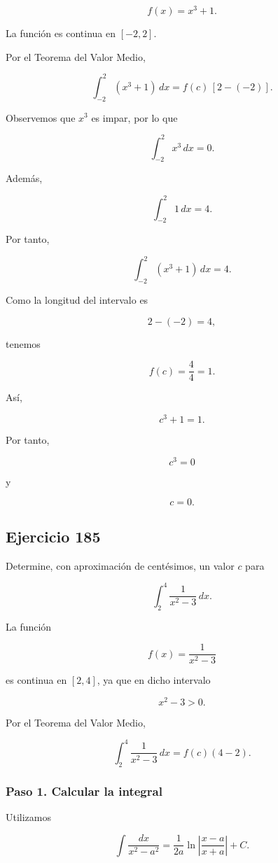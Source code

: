 \documentclass[12pt]{article}
\begin{document}
\[
f(x)=x^3+1.
\]

La función es continua en \([-2,2]\).

Por el Teorema del Valor Medio,

\[
\int_{-2}^{2}(x^3+1)\,dx
=
f(c)\,[2-(-2)].
\]

Observemos que \(x^3\) es impar, por lo que

\[
\int_{-2}^{2}x^3\,dx=0.
\]

Además,

\[
\int_{-2}^{2}1\,dx=4.
\]

Por tanto,

\[
\int_{-2}^{2}(x^3+1)\,dx=4.
\]

Como la longitud del intervalo es

\[
2-(-2)=4,
\]

tenemos

\[
f(c)=\frac44=1.
\]

Así,

\[
c^3+1=1.
\]

Por tanto,

\[
c^3=0
\]

y

\[
\boxed{c=0}.
\]

\subsection*{Ejercicio 185}

Determine, con aproximación de centésimos, un valor \(c\) para

\[
\int_2^4\frac{1}{x^2-3}\,dx.
\]

La función

\[
f(x)=\frac1{x^2-3}
\]

es continua en \([2,4]\), ya que en dicho intervalo

\[
x^2-3>0.
\]

Por el Teorema del Valor Medio,

\[
\int_2^4\frac{1}{x^2-3}\,dx
=
f(c)(4-2).
\]

\subsubsection*{Paso 1. Calcular la integral}

Utilizamos

\[
\int\frac{dx}{x^2-a^2}
=
\frac{1}{2a}
\ln\left|
\frac{x-a}{x+a}
\right|+C.
\]
\end{document}
